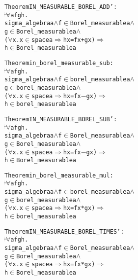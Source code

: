 \begin{hol}
\begin{alltt}
Theorem IN\_MEASURABLE\_BOREL\_ADD' :
\(\!\!\!{\turn}\!\!\!\!\) \(\forall\)a f g h.
sigma\_algebra a \(\land\) f \(\in\) Borel\_measurable a \(\land\)
g \(\in\) Borel\_measurable a \(\land\)
(\(\forall\)x. x \(\in\) space a \(\Rightarrow\) h x = f x + g x) \(\Rightarrow\)
h \(\in\) Borel\_measurable a
\end{alltt}
\end{hol}

\begin{hol}
\begin{alltt}
Theorem in\_borel\_measurable\_sub :
\(\!\!\!{\turn}\!\!\!\!\) \(\forall\)a f g h.
sigma\_algebra a \(\land\) f \(\in\) borel\_measurable a \(\land\)
g \(\in\) borel\_measurable a \(\land\)
(\(\forall\)x. x \(\in\) space a \(\Rightarrow\) h x = f x \({-}\) g x) \(\Rightarrow\)
h \(\in\) borel\_measurable a
\end{alltt}
\end{hol}

\begin{hol}
\begin{alltt}
Theorem IN\_MEASURABLE\_BOREL\_SUB' :
\(\!\!\!{\turn}\!\!\!\!\) \(\forall\)a f g h.
sigma\_algebra a \(\land\) f \(\in\) Borel\_measurable a \(\land\)
g \(\in\) Borel\_measurable a \(\land\)
(\(\forall\)x. x \(\in\) space a \(\Rightarrow\) h x = f x \({-}\) g x) \(\Rightarrow\)
h \(\in\) Borel\_measurable a
\end{alltt}
\end{hol}

\begin{hol}
\begin{alltt}
Theorem in\_borel\_measurable\_mul :
\(\!\!\!{\turn}\!\!\!\!\) \(\forall\)a f g h.
sigma\_algebra a \(\land\) f \(\in\) borel\_measurable a \(\land\)
g \(\in\) borel\_measurable a \(\land\)
(\(\forall\)x. x \(\in\) space a \(\Rightarrow\) h x = f x * g x) \(\Rightarrow\)
h \(\in\) borel\_measurable a
\end{alltt}
\end{hol}

\begin{hol}
\begin{alltt}
Theorem IN\_MEASURABLE\_BOREL\_TIMES' :
\(\!\!\!{\turn}\!\!\!\!\) \(\forall\)a f g h.
sigma\_algebra a \(\land\) f \(\in\) Borel\_measurable a \(\land\)
g \(\in\) Borel\_measurable a \(\land\)
(\(\forall\)x. x \(\in\) space a \(\Rightarrow\) h x = f x * g x) \(\Rightarrow\)
h \(\in\) Borel\_measurable a
\end{alltt}
\end{hol}

